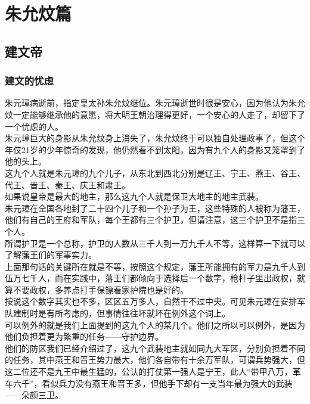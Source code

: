 \chapter*{朱允炆篇}
\section{建文帝}
\ifnum{}
	\begin{multicols}{\theparacolNo}
\fi
\subsection{建文的忧虑}
朱元璋病逝前，指定皇太孙朱允炆继位。朱元璋逝世时很是安心，因为他认为朱允炆一定能够继承他的意愿，将大明王朝治理得更好，一个安心的人走了，却留下了一个忧虑的人。\\

朱元璋巨大的身影从朱允炆身上消失了，朱允炆终于可以独自处理政事了，但这个年仅21岁的少年惊奇的发现，他仍然看不到太阳，因为有九个人的身影又笼罩到了他的头上。\\

这九个人就是朱元璋的九个儿子，从东北到西北分别是辽王、宁王、燕王、谷王、代王、晋王、秦王、庆王和肃王。\\

如果说皇帝是最大的地主，那么这九个人就是保卫大地主的地主武装。\\

朱元璋在全国各地封了二十四个儿子和一个孙子为王，这些特殊的人被称为藩王，他们有自己的王府和军队，每个王都有三个护卫，但请注意，这三个护卫不是指三个人。\\

所谓护卫是一个总称，护卫的人数从三千人到一万九千人不等，这样算一下就可以了解藩王们的军事实力。\\

上面那句话的关键所在就是不等，按照这个规定，藩王所能拥有的军力是九千人到伍万七千人，而在实践中，藩王们都倾向于选择后一个数字，枪杆子里出政权，就算不要政权，多养点打手保镖看家护院也是好的。\\

按说这个数字其实也不多，区区五万多人，自然干不过中央。可见朱元璋在安排军队建制时是有所考虑的，但事情往往坏就坏在例外这个词上。\\

可以例外的就是我们上面提到的这九个人的某几个。他们之所以可以例外，是因为他们负担着更为繁重的任务——守护边界。\\

他们的防区我们已经介绍过了，这九个武装地主就如同九大军区，分别负担着不同的任务，其中燕王和晋王势力最大，他们各自带有十余万军队，可谓兵势强大，但这二位还不是九王中最生猛的，公认的打仗第一强人是宁王，此人“带甲八万，革车六千”，看似兵力没有燕王和晋王多，但他手下却有一支当年最为强大的武装——朵颜三卫。\\


\end{multicols}
